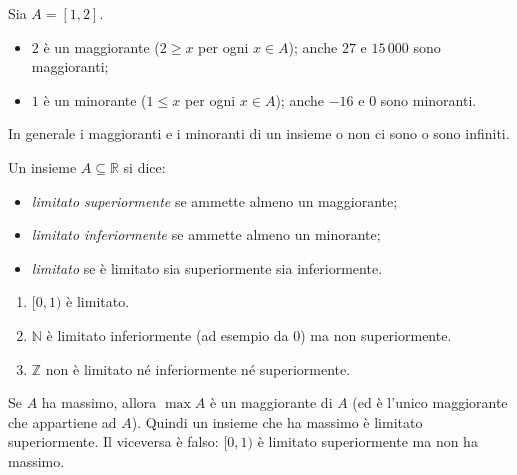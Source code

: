 \documentclass[11pt,a4paper]{article}
\begin{document}
\begin{esempio}
Sia $A = [1, 2]$.
\begin{itemize}
    \item $2$ è un maggiorante ($2 \geq x$ per ogni $x \in A$); anche $27$ e
          $15\,000$ sono maggioranti;
    \item $1$ è un minorante ($1 \leq x$ per ogni $x \in A$); anche $-16$ e $0$
          sono minoranti.
\end{itemize}
In generale i maggioranti e i minoranti di un insieme o non ci sono o sono
infiniti.
\end{esempio}

\begin{definizione}
Un insieme $A \subseteq \mathbb{R}$ si dice:
\begin{itemize}
    \item \emph{limitato superiormente} se ammette almeno un maggiorante;
    \item \emph{limitato inferiormente} se ammette almeno un minorante;
    \item \emph{limitato} se è limitato sia superiormente sia inferiormente.
\end{itemize}
\end{definizione}

\begin{esempio}
\leavevmode
\begin{enumerate}
    \item $[0, 1)$ è limitato.
    \item $\mathbb{N}$ è limitato inferiormente (ad esempio da $0$) ma non
          superiormente.
    \item $\mathbb{Z}$ non è limitato né inferiormente né superiormente.
\end{enumerate}
\end{esempio}

Se $A$ ha massimo, allora $\max A$ è un maggiorante di $A$ (ed è l'unico
maggiorante che appartiene ad $A$). Quindi un insieme che ha massimo è
limitato superiormente. Il viceversa è falso: $[0, 1)$ è limitato
superiormente ma non ha massimo.
\end{document}
